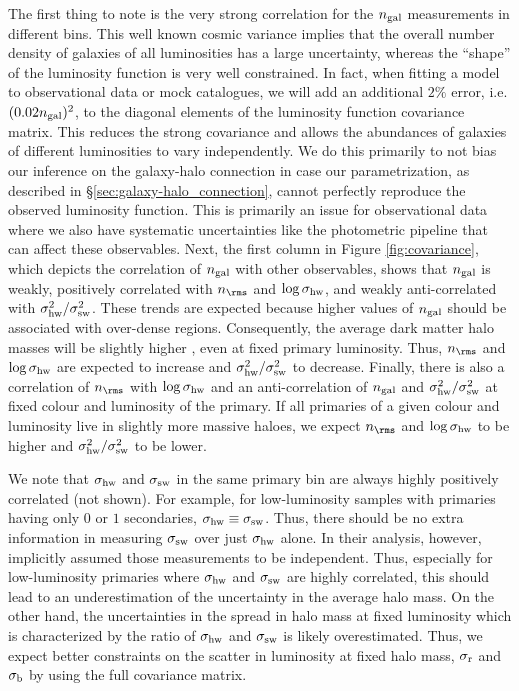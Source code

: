 \documentclass[fleqn,usenatbib,useAMS]{mnras}
\begin{document}
	The first thing to note is the very strong correlation for the $n_{\rm gal}$ measurements in different bins. This well known cosmic variance \citep[see e.g.][]{Moster+11, Smith+12} implies that the overall number density of galaxies of all luminosities has a large uncertainty, whereas the ``shape'' of the luminosity function is very well constrained. In fact, when fitting a model to observational data or mock catalogues, we will add an additional $2\%$ error, i.e. $(0.02 n_{\rm gal})^2$, to the diagonal elements of the luminosity function covariance matrix. This reduces the strong covariance and allows the abundances of galaxies of different luminosities to vary independently. We do this primarily to not bias our inference on the galaxy-halo connection in case our parametrization, as described in \S\ref{sec:galaxy-halo_connection}, cannot perfectly reproduce the observed luminosity function. This is primarily an issue for observational data where we also have systematic uncertainties like the photometric pipeline that can affect these observables. Next, the first column in Figure \ref{fig:covariance}, which depicts the correlation of $n_{\rm gal}$ with other observables, shows that $n_{\rm gal}$ is weakly, positively correlated with $n_\rms$ and $\log \sigma_{\rm hw}$, and weakly anti-correlated with  $\sigma_{\rm hw}^2 / \sigma_{\rm sw}^2$. These trends are expected because higher values of $n_{\rm gal}$ should be associated with over-dense regions. Consequently, the average dark matter halo masses will be slightly higher \citep[e.g.,][]{Mo+04}, even at fixed primary luminosity. Thus, $n_\rms$ and $\log \sigma_{\rm hw}$ are expected to increase and $\sigma_{\rm hw}^2 / \sigma_{\rm sw}^2$ to decrease. Finally, there is also a correlation of $n_\rms$ with $\log \sigma_{\rm hw}$ and an anti-correlation of $n_{\rm gal}$ and $\sigma_{\rm hw}^2 / \sigma_{\rm sw}^2$ at fixed colour and luminosity of the primary. If all primaries of a given colour and luminosity live in slightly more massive haloes, we expect $n_\rms$ and $\log \sigma_{\rm hw}$ to be higher and $\sigma_{\rm hw}^2 / \sigma_{\rm sw}^2$ to be lower.
	
	We note that $\sigma_{\rm hw}$ and $\sigma_{\rm sw}$ in the same primary bin are always highly positively correlated (not shown). For example, for low-luminosity samples with primaries having only $0$ or $1$ secondaries, $\sigma_{\rm hw} \equiv \sigma_{\rm sw}$. Thus, there should be no extra information in measuring $\sigma_{\rm sw}$ over just $\sigma_{\rm hw}$ alone. In their analysis, however, \cite{More+09b, More+11} implicitly assumed those measurements to be independent. Thus, especially for low-luminosity primaries where $\sigma_{\rm hw}$ and $\sigma_{\rm sw}$ are highly correlated, this should lead to an underestimation of the uncertainty in the average halo mass. On the other hand, the uncertainties in the spread in halo mass at fixed luminosity which is characterized by the ratio of $\sigma_{\rm hw}$ and $\sigma_{\rm sw}$ is likely overestimated. Thus, we expect better constraints on the scatter in luminosity at fixed halo mass, $\sigma_{\rm r}$ and $\sigma_{\rm b}$ by using the full covariance matrix.
	
\end{document}
